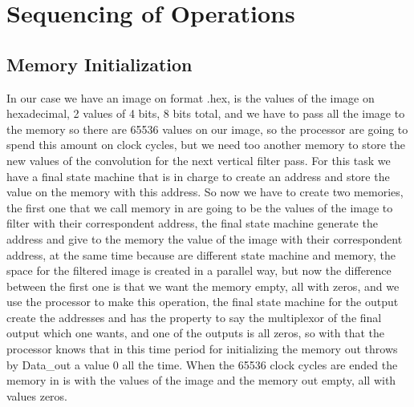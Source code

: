 \documentclass[11pt,a4paper]{article}
\begin{document}
\FlowBarrier
\section{Sequencing of Operations}
\subsection{Memory Initialization}
In our case we have an image on format .hex, is the values of the image on hexadecimal, 2 values of 4 bits, 8 bits total, and we have to pass all the image to the memory so there are 65536 values on our image, so the processor are going to spend this amount on clock cycles, but we need too another memory to store the new values of the convolution for the next vertical filter pass. For this task we have a final state machine that is in charge to create an address and store the value on the memory with this address. So now we have to create two memories, the first one that we call memory in are going to be the values of the image to filter with their correspondent address, the final state machine generate the address and give to the memory the value of the image with their correspondent address, at the same time because are different state machine and memory, the space for the filtered image is created in a parallel way, but now the difference between the first one is that we want the memory empty, all with zeros, and we use the processor to make this operation, the final state machine for the output create the addresses and has the property to say the multiplexor of the final output which one wants, and one of the outputs is all zeros, so with that the processor knows that in this time period for initializing the memory out throws by Data\_out a value 0 all the time.
When the 65536 clock cycles are ended the memory in is with the values of the image and the memory out empty, all with values zeros.	
\end{document}

